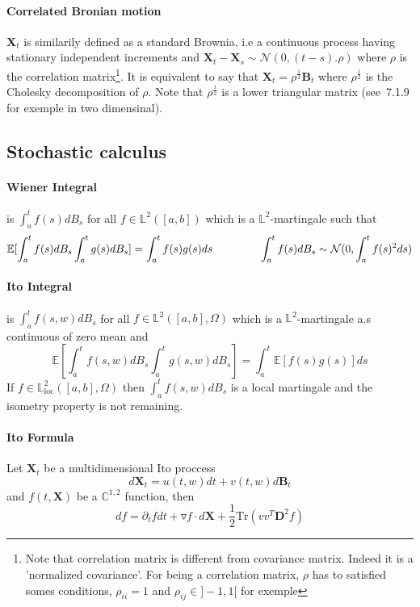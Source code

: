 \documentclass[a4paper,10pt]{article}
\begin{document}
\paragraph{Correlated Bronian motion } $\textbf{X}_t$ is similarily defined as a standard Brownia, i.e a continuous process having stationary independent increments and $\textbf{X}_t - \textbf{X}_s \sim \mathcal{N}(0,(t-s).\rho)$ where $\rho$ is the correlation matrix\footnote{Note that correlation matrix is different from covariance matrix. Indeed it is a 'normalized covariance'. For being a correlation matrix, $\rho$ has to satisfied somes conditions, $\rho_{ii}=1$ and $\rho_{ij} \in ]-1,1[$ for exemple}. It is equivalent to say that $\textbf{X}_t = \rho^{\frac{1}{2}} \textbf{B}_t$ where $\rho^{\frac{1}{2}}$ is the Cholesky decomposition of $\rho$. Note that $\rho^{\frac{1}{2}}$ is a lower triangular matrix (see~\cite{MAREK}7.1.9 for exemple in two dimensinal).

\subsection{Stochastic calculus}
\paragraph{Wiener Integral} is $\int_a^t f(s)dB_s$ for all $f\in \mathbb{L}^2([a,b])$ which is a $\mathbb{L}^2$-martingale such that
\[
\mathbb{E}[\int_a^t f(s)dB_s \int_a^t g(s)dB_s] = \int_a^t f(s)g(s)ds
\hspace{1.5cm}
\int_a^t f(s)dB_s \sim \mathcal{N}(0, \int_a^t f(s)^2ds)
\]
\paragraph{Ito Integral} is $\int_a^t f(s,w)dB_s$ for all $f\in \mathbb{L}^2([a,b],\Omega)$ which is a $\mathbb{L}^2$-martingale a.s continuous of zero mean and
\[
\mathbb{E}[\int_a^t f(s,w)dB_s \int_a^t g(s,w)dB_s] = \int_a^t \mathbb{E}[f(s)g(s)]ds
\]
If $f\in \mathbb{L}_{\text{loc}}^2([a,b],\Omega)$ then $\int_a^t f(s,w)dB_s$ is a local martingale and the isometry property is not remaining.
\paragraph{Ito Formula}
Let $\textbf{X}_t$ be a multidimensional Ito proccess
\[
d\textbf{X}_t = u(t,w)dt + v(t,w)d\textbf{B}_t
\]
and $f(t,\textbf{X})$ be a $\mathbb{C}^{1,2}$ function, then
\[
df = \partial_t f dt + \triangledown f \cdot d\textbf{X} + \frac{1}{2} \text{Tr}(vv^T \textbf{D}^2f  )
\]
\end{document}
